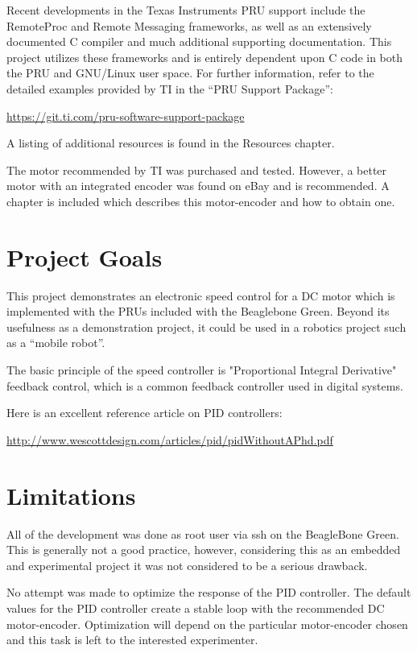 Recent developments in the Texas Instruments PRU support include the RemoteProc and Remote Messaging frameworks, as well as an extensively documented C compiler and much additional supporting documentation.  This project utilizes these frameworks and is entirely dependent upon C code in both the PRU and GNU/Linux user space.  For further information, refer to the detailed examples provided by TI in the ``PRU Support Package'':

\url{https://git.ti.com/pru-software-support-package}

A listing of additional resources is found in the Resources chapter.

The motor recommended by TI was purchased and tested.  However, a better motor with an integrated encoder was found on eBay and is recommended.  A chapter is included which describes this motor-encoder and how to obtain one.

\section{Project Goals}

This project demonstrates an electronic speed control for a DC motor which is implemented with the PRUs included with the Beaglebone Green.  Beyond its usefulness as a demonstration project, it could be used in a robotics project such as a ``mobile robot''.

The basic principle of the speed controller is "Proportional Integral Derivative" feedback control, which is a common feedback controller used in digital systems.

Here is an excellent reference article on PID controllers:

\url{http://www.wescottdesign.com/articles/pid/pidWithoutAPhd.pdf}

\section{Limitations}

All of the development was done as root user via ssh on the BeagleBone Green.  This is generally not a good practice, however, considering this as an embedded and experimental project it was not considered to be a serious drawback.

No attempt was made to optimize the response of the PID controller.  The default values for the PID controller create a stable loop with the recommended DC motor-encoder.  Optimization will depend on the particular motor-encoder chosen and this task is left to the interested experimenter.



